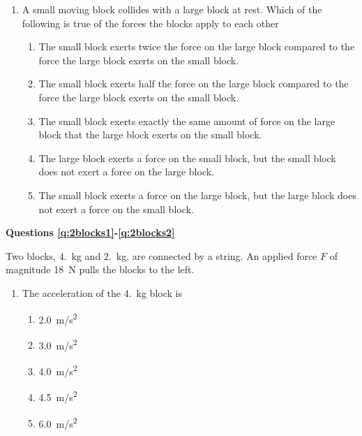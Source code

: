 \documentclass{../../../oss-apphys}
\begin{document}
\genheader


\genmultidirections

\gengravity

\raggedcolumns
\begin{multicols}{2}
  \begin{enumerate}[leftmargin=18pt]
  \item A small moving block collides with a large block at rest. Which of the
    following is true of the forces the blocks apply to each other
    \begin{enumerate}[noitemsep,topsep=0pt,leftmargin=18pt,label=(\Alph*)]
    \item The small block exerts twice the force on the large block
      compared to the force the large block exerts on the small block.
    \item The small block exerts half the force on the large block compared
      to the force the large block exerts on the small block.
    \item The small block exerts exactly the same amount of force on the
      large block that the large block exerts on the small block.
    \item The large block exerts a force on the small block, but the small
      block does not exert a force on the large block.
    \item The small block exerts a force on the large block, but the large
      block does not exert a force on the small block.
    \end{enumerate}
    
  \end{enumerate}
  
  \textbf{Questions \ref{q:2blocks1}-\ref{q:2blocks2}}

  Two blocks, \SI{4.}{\kilo\gram} and \SI{2.}{\kilo\gram}, are connected by a
  string. An applied force $F$ of magnitude \SI{18}{\newton} pulls the blocks
  to the left.
  \begin{center}
  \end{center}
  
  \begin{enumerate}[resume,leftmargin=18pt]
    
  \item The acceleration of the \SI{4.}{\kilo\gram} block is
    \begin{enumerate}[noitemsep,topsep=0pt,leftmargin=18pt,label=(\Alph*)]
    \item\SI{2.0}{m/s^2}
    \item\SI{3.0}{m/s^2}
    \item\SI{4.0}{m/s^2}
    \item\SI{4.5}{m/s^2}
    \item\SI{6.0}{m/s^2}
    \end{enumerate}
    \label{q:2blocks1}
    

\end{enumerate}
\end{multicols}
\end{document}
